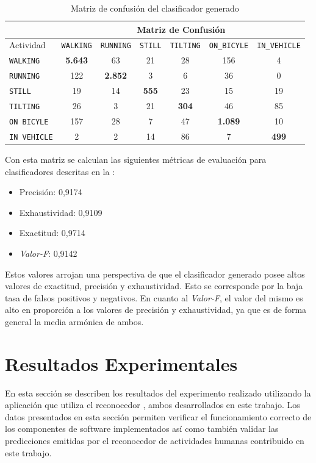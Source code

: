\begin{table}[h]
\begin{centering}
\begin{tabular}{|l|c|c|c|c|c|c|}
\cline{2-7} 
\multicolumn{1}{l|}{} & \multicolumn{6}{c|}{Matriz de Confusión}\tabularnewline
\hline 
Actividad & \texttt{\footnotesize{}WALKING} & \texttt{\footnotesize{}RUNNING} & \texttt{\footnotesize{}STILL} & \texttt{\footnotesize{}TILTING} & \texttt{\footnotesize{}ON\_BICYLE} & \texttt{\footnotesize{}IN\_VEHICLE}\tabularnewline
\hline 
\hline 
\texttt{\footnotesize{}WALKING} & \textbf{5.643} & 63 & 21 & 28 & 156 & 4\tabularnewline
\hline 
\texttt{\footnotesize{}RUNNING} & 122 & \textbf{2.852} & 3 & 6 & 36 & 0\tabularnewline
\hline 
\texttt{\footnotesize{}STILL} & 19 & 14 & \textbf{555} & 23 & 15 & 19\tabularnewline
\hline 
\texttt{\footnotesize{}TILTING} & 26 & 3 & 21 & \textbf{304} & 46 & 85\tabularnewline
\hline 
\texttt{\footnotesize{}ON BICYLE} & 157 & 28 & 7 & 47 & \textbf{1.089} & 10\tabularnewline
\hline 
\texttt{\footnotesize{}IN VEHICLE} & 2 & 2 & 14 & 86 & 7 & \textbf{499}\tabularnewline
\hline 
\end{tabular}
\par\end{centering}
\caption{\label{tab6:matriz-confusion}Matriz de confusión del clasificador
generado}
\end{table}

Con esta matriz se calculan las siguientes métricas de evaluación
para clasificadores descritas en la :
\begin{itemize}
\item Precisión: 0,9174
\item Exhaustividad: 0,9109
\item Exactitud: 0,9714
\item \emph{Valor-F}: 0,9142
\end{itemize}
Estos valores arrojan una perspectiva de que el clasificador generado
posee altos valores de exactitud, precisión y exhaustividad. Esto
se corresponde por la baja tasa de falsos positivos y negativos. En
cuanto al \emph{Valor-F}, el valor del mismo es alto en proporción
a los valores de precisión y exhaustividad, ya que es de forma general
la media armónica de ambos.

\section{Resultados Experimentales}

\label{sec6:resultados}En esta sección se describen los resultados
del experimento realizado utilizando la aplicación \emph{}
que utiliza el reconocedor \emph{}, ambos desarrollados
en este trabajo. Los datos presentados en esta sección permiten verificar
el funcionamiento correcto de los componentes de software implementados
así como también validar las predicciones emitidas por el reconocedor
de actividades humanas contribuido en este trabajo.

